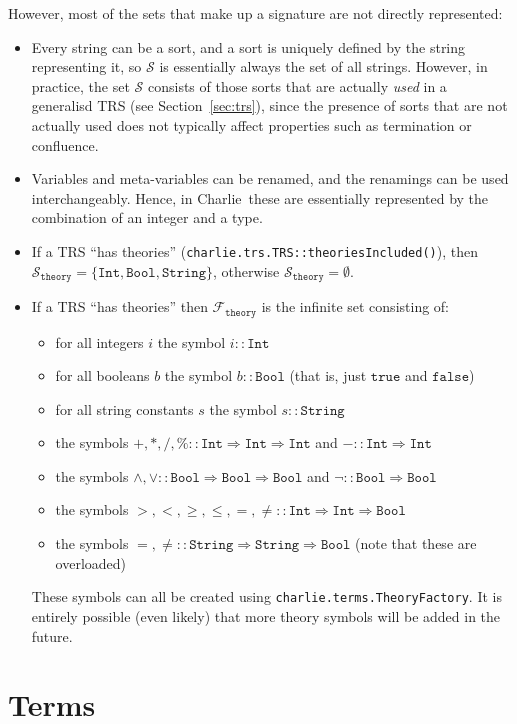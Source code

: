 \documentclass{lmcs}
\theoremstyle{theorem}\newtheorem{theorem}{Theorem}
\theoremstyle{theorem}\newtheorem{lemma}[theorem]{Lemma}
\theoremstyle{theorem}\newtheorem{corollary}[theorem]{Corollary}
\theoremstyle{definition}\newtheorem{definition}[theorem]{Definition}
\theoremstyle{definition}\newtheorem{example}[theorem]{Example}
\newcommand{\thF}{\mathcal{F}_{\mathtt{theory}}}
\newcommand{\Sorts}{\mathcal{S}}
\newcommand{\thSorts}{\mathcal{S}_{\mathtt{theory}}}
\newcommand{\arrtype}{\Rightarrow}
\newcommand{\symb}[1]{\mathtt{#1}}
\newcommand{\strue}{\symb{true}}
\newcommand{\sfalse}{\symb{false}}
\newcommand{\bool}{\symb{Bool}}
\newcommand{\tint}{\symb{Int}}
\newcommand{\tstring}{\symb{String}}
\newcommand{\charlie}{\textsf{Charlie}\xspace}
\begin{document}
\medskip
However, most of the sets that make up a signature are not directly represented:
\begin{itemize}
\item Every string can be a sort, and a sort is uniquely defined by the string
  representing it, so $\Sorts$ is essentially always the set of all strings.
  However, in practice, the set $\Sorts$ consists of those sorts that are
  actually \emph{used} in a generalisd TRS (see Section~\ref{sec:trs}), since
  the presence of sorts that are not actually used does not typically affect
  properties such as termination or confluence.
\item Variables and meta-variables can be renamed, and the renamings can be
  used interchangeably.  Hence, in \charlie\ these are essentially represented
  by the combination of an integer and a type.
\item If a TRS ``has theories'' (\texttt{charlie.trs.TRS::theoriesIncluded()}),
  then $\thSorts = \{\tint,\bool,\tstring\}$, otherwise $\thSorts =
  \emptyset$.
\item If a TRS ``has theories'' then $\thF$ is the infinite set consisting of:
  \begin{itemize}
  \item for all integers $i$ the symbol $i :: \tint$
  \item for all booleans $b$ the symbol $b :: \bool$ (that is, just $\strue$
    and $\sfalse$)
  \item for all string constants $s$ the symbol $s :: \tstring$
  \item the symbols $+,*,/,\% :: \tint \arrtype \tint \arrtype \tint$ and
    $- :: \tint \arrtype \tint$
  \item the symbols $\wedge,\vee :: \bool \arrtype \bool \arrtype \bool$ and
    $\neg :: \bool \arrtype \bool$
  \item the symbols $>,<,\geq,\leq,=,\neq :: \tint \arrtype \tint \arrtype
    \bool$
  \item the symbols $=,\neq :: \tstring \arrtype \tstring \arrtype \bool$
    (note that these are overloaded) \\
  \end{itemize}
  These symbols can all be created using \texttt{charlie.terms.TheoryFactory}.
  It is entirely possible (even likely) that more theory symbols will be added
  in the future.
\end{itemize}

\section{Terms}\label{sec:terms}
\end{document}
